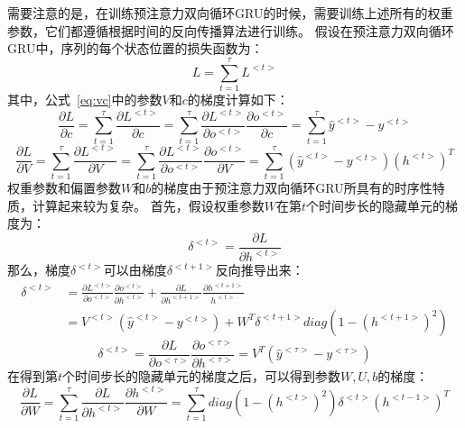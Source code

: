需要注意的是，在训练预注意力双向循环GRU的时候，需要训练上述所有的权重参数，它们都遵循根据时间的反向传播算法进行训练。
假设在预注意力双向循环GRU中，序列的每个状态位置的损失函数为：
\begin{equation}
L=\sum_{t=1}^{\tau }L^{<t>}
\end{equation}
其中，公式~\ref{eq:vc}中的参数${V}$和${c}$的梯度计算如下：
\begin{equation}
\frac{\partial L}{\partial c}=\sum_{t=1}^{\tau }\frac{\partial L^{<t>}}{\partial c}=\sum_{t=1}^{\tau }\frac{\partial L^{<t>}}{\partial o^{<t>}}\frac{\partial o^{<t>}}{\partial c}=\sum_{t=1}^{\tau }\widehat{y}^{<t>}-y^{<t>}
\end{equation}
\begin{equation}
\frac{\partial L}{\partial V}=\sum_{t=1}^{\tau }\frac{\partial L^{<t>}}{\partial V}=\sum_{t=1}^{\tau }\frac{\partial L^{<t>}}{\partial o^{<t>}}\frac{\partial o^{<t>}}{\partial V}=\sum_{t=1}^{\tau }\left ( \widehat{y}^{<t>}-y^{<t>} \right )\left ( h^{<t>} \right )^{T}
\end{equation}
权重参数和偏置参数${W}$和${b}$的梯度由于预注意力双向循环GRU所具有的时序性特质，计算起来较为复杂。
首先，假设权重参数${W}$在第${t}$个时间步长的隐藏单元的梯度为：
\begin{equation}
\delta ^{<t>}=\frac{\partial L}{\partial h^{<t>}}
\end{equation}
那么，梯度${\delta ^{<t>}}$可以由梯度${\delta ^{<t+1>}}$反向推导出来：
\begin{equation}
	\begin{aligned}
\delta ^{<t>} & =\frac{\partial L^{<t>}}{\partial o^{<t>}}\frac{\partial o^{<t>}}{\partial h^{<t>}}+\frac{\partial L}{\partial h^{<t+1>}}\frac{\partial h^{<t+1>}}{h^{<t>}} \\
& =V^{<t>}\left ( \widehat{y}^{<t>}-y^{<t>} \right )+W^{T}\delta ^{<t+1>}diag\left ( 1-\left ( h^{<t+1>} \right )^{2} \right)
	\end{aligned}
\end{equation}
\begin{equation}
\delta ^{<t>}=\frac{\partial L}{\partial o^{<\tau >}}\frac{\partial o^{<\tau >}}{\partial h^{<\tau >}}=V^{T}\left ( \widehat{y}^{<\tau >}-y^{<\tau >} \right )
\end{equation}
在得到第${t}$个时间步长的隐藏单元的梯度之后，可以得到参数${W,U,b}$的梯度：
\begin{equation}
\frac{\partial L}{\partial W}=\sum_{t=1}^{\tau }\frac{\partial L}{\partial h^{<t>}}\frac{\partial h^{<t>}}{\partial W}=\sum_{t=1}^{\tau }diag\left ( 1-\left ( h^{<t>} \right )^{2} \right )\delta^{<t>} \left ( h^{<t-1>} \right )^{T}
\end{equation}
